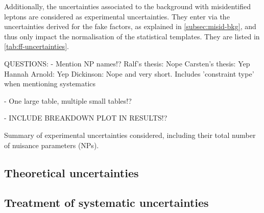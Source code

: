 Additionally, the uncertainties associated to the background with misidentified leptons are considered as experimental uncertainties. They enter via the uncertainties derived for the fake factors, as explained in \cref{subsec:misid-bkg}, and thus only impact the normalisation of the statistical templates.
They are listed in \cref{tab:ff-uncertainties}.





QUESTIONS:
- Mention NP names!?
Ralf's thesis: Nope
Carsten's thesis: Yep
Hannah Arnold: Yep
Dickinson: Nope and very short. Includes 'constraint type' when mentioning systematics

- One large table, multiple small tables!?

- INCLUDE BREAKDOWN PLOT IN RESULTS!?


\begin{table}[ht]
    \begin{center}
        
    \end{center}
    \caption{Summary of experimental uncertainties considered, including their total number of nuisance parameters (NPs).
    }
    \label{tab:exp-uncertainties}
\end{table}



\subsection{Theoretical uncertainties}


\subsection{Treatment of systematic uncertainties}

